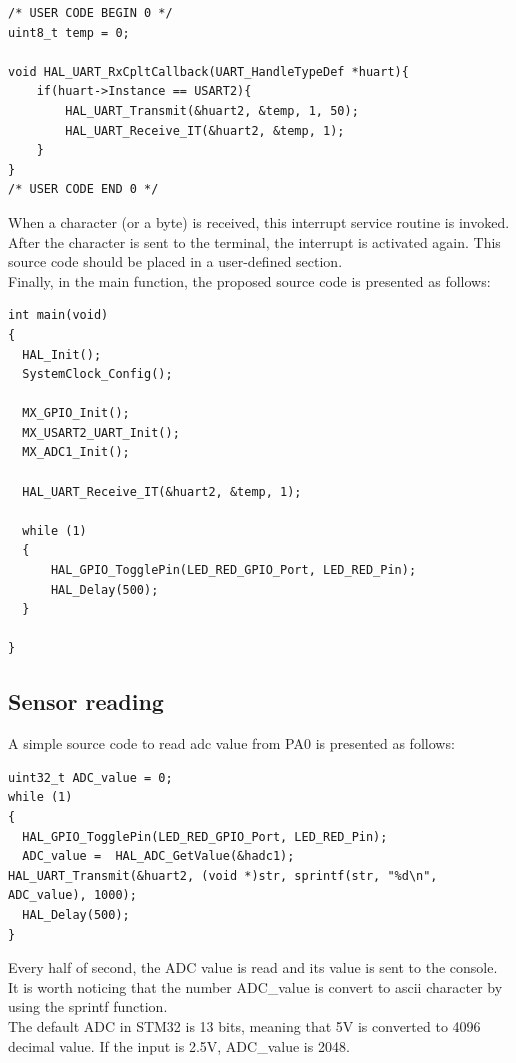 \begin{lstlisting}[caption= Implement the UART interrupt service routine]
/* USER CODE BEGIN 0 */
uint8_t temp = 0;

void HAL_UART_RxCpltCallback(UART_HandleTypeDef *huart){
	if(huart->Instance == USART2){
		HAL_UART_Transmit(&huart2, &temp, 1, 50);
		HAL_UART_Receive_IT(&huart2, &temp, 1);
	}
}
/* USER CODE END 0 */
\end{lstlisting}

When a character (or a byte) is received, this interrupt service routine is invoked. After the character is sent to the terminal, the interrupt is activated again. This source code should be placed in a user-defined section.\\

Finally, in the main function, the proposed source code is presented as follows:

\begin{lstlisting}[caption=Implement the main function]
int main(void)
{
  HAL_Init();
  SystemClock_Config();

  MX_GPIO_Init();
  MX_USART2_UART_Init();
  MX_ADC1_Init();

  HAL_UART_Receive_IT(&huart2, &temp, 1);

  while (1)
  {
	  HAL_GPIO_TogglePin(LED_RED_GPIO_Port, LED_RED_Pin);
	  HAL_Delay(500);
  }
  
}
\end{lstlisting}

\subsection{Sensor reading}
A simple source code to read adc value from PA0 is presented as follows:
\begin{lstlisting}[caption=ADC reading from AN0]
uint32_t ADC_value = 0;
while (1)
{
  HAL_GPIO_TogglePin(LED_RED_GPIO_Port, LED_RED_Pin);
  ADC_value =  HAL_ADC_GetValue(&hadc1);
HAL_UART_Transmit(&huart2, (void *)str, sprintf(str, "%d\n", ADC_value), 1000);
  HAL_Delay(500);
}
\end{lstlisting}

Every half of second, the ADC value is read and its value is sent to the console. It is worth noticing that the number ADC\_value is convert to ascii character by  using the sprintf function.\\

The default ADC in STM32 is 13 bits, meaning that 5V is converted to 4096 decimal value. If the input is 2.5V, ADC\_value is 2048.

